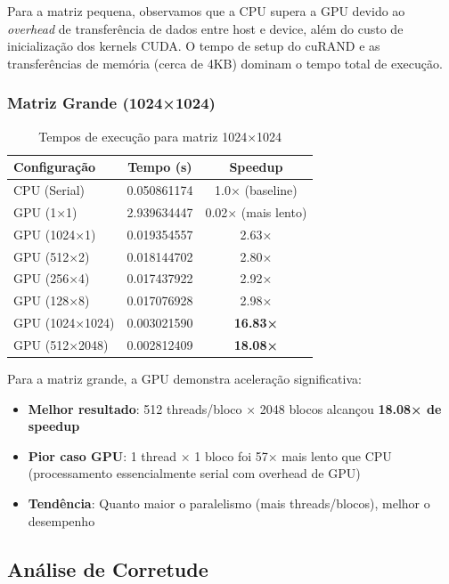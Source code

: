 \documentclass{article}
\begin{document}
Para a matriz pequena, observamos que a CPU supera a GPU devido ao \textit{overhead} de transferência de dados entre host e device, além do custo de inicialização dos kernels CUDA. O tempo de setup do cuRAND e as transferências de memória (cerca de 4KB) dominam o tempo total de execução.

\subsubsection{Matriz Grande (1024×1024)}

\begin{table}[H]
\centering
\begin{tabular}{lcc}
\toprule
\textbf{Configuração} & \textbf{Tempo (s)} & \textbf{Speedup} \\
\midrule
CPU (Serial) & 0.050861174 & 1.0× (baseline) \\
GPU (1×1) & 2.939634447 & 0.02× (mais lento) \\
GPU (1024×1) & 0.019354557 & 2.63× \\
GPU (512×2) & 0.018144702 & 2.80× \\
GPU (256×4) & 0.017437922 & 2.92× \\
GPU (128×8) & 0.017076928 & 2.98× \\
GPU (1024×1024) & 0.003021590 & \textbf{16.83×} \\
GPU (512×2048) & 0.002812409 & \textbf{18.08×} \\
\bottomrule
\end{tabular}
\caption{Tempos de execução para matriz 1024×1024}
\end{table}

Para a matriz grande, a GPU demonstra aceleração significativa:
\begin{itemize}
    \item \textbf{Melhor resultado}: 512 threads/bloco × 2048 blocos alcançou \textbf{18.08× de speedup}
    \item \textbf{Pior caso GPU}: 1 thread × 1 bloco foi 57× mais lento que CPU (processamento essencialmente serial com overhead de GPU)
    \item \textbf{Tendência}: Quanto maior o paralelismo (mais threads/blocos), melhor o desempenho
\end{itemize}

\subsection{Análise de Corretude}
\end{document}
